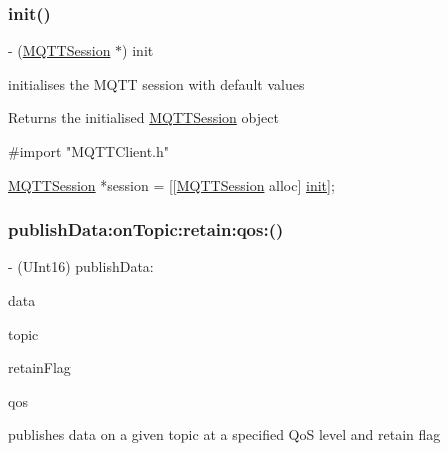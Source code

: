 \subsubsection{\texorpdfstring{init()}{init()}}
{\footnotesize\ttfamily -\/ (\hyperlink{interface_m_q_t_t_session}{M\+Q\+T\+T\+Session} $\ast$) init \begin{DoxyParamCaption}{ }\end{DoxyParamCaption}}

initialises the M\+Q\+TT session with default values \begin{DoxyReturn}{Returns}
the initialised \hyperlink{interface_m_q_t_t_session}{M\+Q\+T\+T\+Session} object 
\begin{DoxyCode}
\textcolor{preprocessor}{#import "MQTTClient.h"}

\hyperlink{interface_m_q_t_t_session}{MQTTSession} *session = [[\hyperlink{interface_m_q_t_t_session}{MQTTSession} alloc] \hyperlink{interface_m_q_t_t_session_aee55d52a9b6395f1a0d73b672900629c}{init}];
\end{DoxyCode}
 
\end{DoxyReturn}
\mbox{\label{interface_m_q_t_t_session_a7551772841b6bc2f46c0848d323fd0f7}} 
\subsubsection{\texorpdfstring{publish\+Data\+:on\+Topic\+:retain\+:qos\+:()}{publishData:onTopic:retain:qos:()}}
{\footnotesize\ttfamily -\/ (U\+Int16) publish\+Data\+: \begin{DoxyParamCaption}\item[{(N\+S\+Data $\ast$)}]{data }\item[{onTopic:(N\+S\+String $\ast$)}]{topic }\item[{retain:(B\+O\+OL)}]{retain\+Flag }\item[{qos:(M\+Q\+T\+T\+Qos\+Level)}]{qos }\end{DoxyParamCaption}}

publishes data on a given topic at a specified QoS level and retain flag


